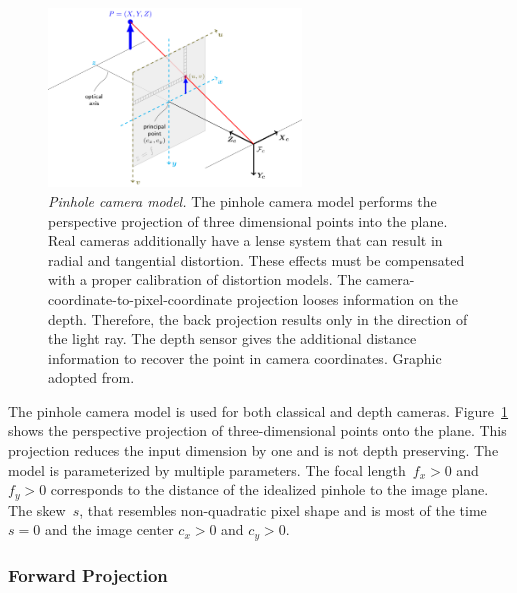 \begin{figure}[H]
    \includegraphics[width=0.6\textwidth]{chapter03/img/pinhole_camera_model.png}
    \caption[Pinhole camera model]{\emph{Pinhole camera model.} The pinhole camera model performs the perspective projection of three dimensional points into the plane. Real cameras additionally have a lense system that can result in radial and tangential distortion. These effects must be compensated with a proper calibration of distortion models. The camera-coordinate-to-pixel-coordinate projection looses information on the depth. Therefore, the back projection results only in the direction of the light ray. The depth sensor gives the additional distance information to recover the point in camera coordinates. Graphic adopted from\cite{opencv_pinhole}.}\label{fig:pinhole_model}
\end{figure}
The pinhole camera model is used for both classical and depth cameras.
Figure~\ref{fig:pinhole_model} shows the perspective projection of three-dimensional points onto the plane\cite[p. 25-35]{hartley_2004}.
This projection reduces the input dimension by one and is not depth preserving.
The model is parameterized by multiple parameters.
The focal length~$f_x > 0$ and $f_y > 0$ corresponds to the distance of the idealized pinhole to the image plane.
The skew~$s$, that resembles non-quadratic pixel shape and is most of the time $s = 0$ and the image center $c_x > 0$ and $c_y > 0$.

\subsubsection*{Forward Projection}

